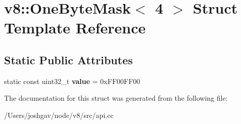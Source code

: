 \hypertarget{structv8_1_1_one_byte_mask_3_014_01_4}{}\section{v8\+:\+:One\+Byte\+Mask$<$ 4 $>$ Struct Template Reference}
\label{structv8_1_1_one_byte_mask_3_014_01_4}
\subsection*{Static Public Attributes}
\begin{DoxyCompactItemize}
\item 
static const uint32\+\_\+t {\bfseries value} = 0x\+F\+F00\+F\+F00\hypertarget{structv8_1_1_one_byte_mask_3_014_01_4_af50f63869f0617580be0e3fbb80ea583}{}\label{structv8_1_1_one_byte_mask_3_014_01_4_af50f63869f0617580be0e3fbb80ea583}

\end{DoxyCompactItemize}


The documentation for this struct was generated from the following file\+:\begin{DoxyCompactItemize}
\item 
/\+Users/joshgav/node/v8/src/api.\+cc\end{DoxyCompactItemize}
